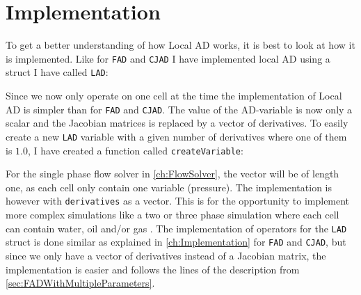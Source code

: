 \section{Implementation}
To get a better understanding of how Local AD works, it is best to look at how it is implemented. Like for \texttt{FAD} and \texttt{CJAD} I have implemented local AD using a struct I have called \texttt{LAD}:

Since we now only operate on one cell at the time the implementation of Local AD is simpler than for \texttt{FAD} and \texttt{CJAD}. The value of the AD-variable is now only a scalar and the Jacobian matrices is replaced by a vector of derivatives. To easily create a new \texttt{LAD} variable with a given number of derivatives where one of them is $1.0$, I have created a function called \texttt{createVariable}:

For the single phase flow solver in \autoref{ch:FlowSolver}, the vector will be of length one, as each cell only contain one variable (pressure). The implementation is however with \texttt{derivatives} as a vector. This is for the opportunity to implement more complex simulations like a two or three phase simulation where each cell can contain water, oil and/or gas . The implementation of operators for the \texttt{LAD} struct is done similar as explained in \autoref{ch:Implementation} for \texttt{FAD} and \texttt{CJAD}, but since we only have a vector of derivatives instead of a Jacobian matrix, the implementation is easier and follows the lines of the description from \autoref{sec:FADWithMultipleParameters}. 


